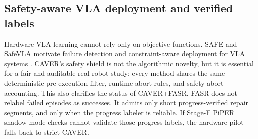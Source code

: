 \documentclass[10pt]{article}
\theoremstyle{plain}
\theoremstyle{definition}
\theoremstyle{remark}
\begin{document}
\subsection{Safety-aware VLA deployment and verified labels}
Hardware VLA learning cannot rely only on objective functions. SAFE and SafeVLA motivate failure detection and constraint-aware deployment for VLA systems \citep{gu2025safe,zhang2025safevla}. CAVER's safety shield is not the algorithmic novelty, but it is essential for a fair and auditable real-robot study: every method shares the same deterministic pre-execution filter, runtime abort rules, and safety-abort accounting. This also clarifies the status of CAVER+FASR. FASR does not relabel failed episodes as successes. It admits only short progress-verified repair segments, and only when the progress labeler is reliable. If Stage-F PiPER shadow-mode checks cannot validate those progress labels, the hardware pilot falls back to strict CAVER.
\end{document}
